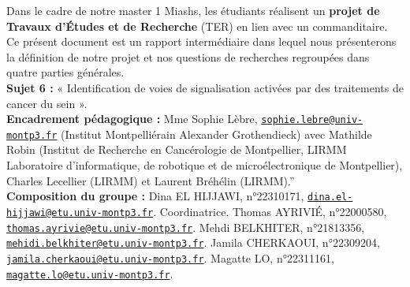 \documentclass[mstat,12pt]{unswthesis}
\begin{document}
Dans le cadre de notre master 1 Miashs, les étudiants réalisent un
\textbf{projet de Travaux d’Études et de Recherche} (TER) en lien avec
un commanditaire. Ce présent document est un rapport intermédiaire dans
lequel nous présenterons la définition de notre projet et nos questions
de recherches regroupées dans quatre parties
générales.\\[1cm] \textbf{Sujet 6 :} « Identification de voies de
signalisation activées par des traitements de cancer du sein
».\\[1cm] \textbf{Encadrement pédagogique :} \newline Mme Sophie Lèbre,
\href{mailto:sophie.lebre@univ-montp3.fr}{\nolinkurl{sophie.lebre@univ-montp3.fr}}
(Institut Montpelliérain Alexander Grothendieck) avec Mathilde Robin
(Institut de Recherche en Cancérologie de Montpellier, LIRMM Laboratoire
d'informatique, de robotique et de microélectronique de Montpellier),
Charles Lecellier (LIRMM) et Laurent Bréhélin
(LIRMM).''\\[1cm] \textbf{Composition du groupe :} \newline Dina EL
HIJJAWI, n°22310171,
\href{mailto:dina.el-hijjawi@etu.univ-montp3.fr}{\nolinkurl{dina.el-hijjawi@etu.univ-montp3.fr}}.
Coordinatrice. \newline Thomas AYRIVIÉ, n°22000580,
\href{mailto:thomas.ayrivie@etu.univ-montp3.fr}{\nolinkurl{thomas.ayrivie@etu.univ-montp3.fr}}.
\newline Mehdi BELKHITER, n°21813356,
\href{mailto:mehidi.belkhiter@etu.univ-montp3.fr}{\nolinkurl{mehidi.belkhiter@etu.univ-montp3.fr}}.
\newline Jamila CHERKAOUI, n°22309204,
\href{mailto:jamila.cherkaoui@etu.univ-montp3.fr}{\nolinkurl{jamila.cherkaoui@etu.univ-montp3.fr}}.
\newline Magatte LO, n°22311161,
\href{mailto:magatte.lo@etu.univ-montp3.fr}{\nolinkurl{magatte.lo@etu.univ-montp3.fr}}.\\[1cm] 



\afterpreface





%
%



\end{document}
